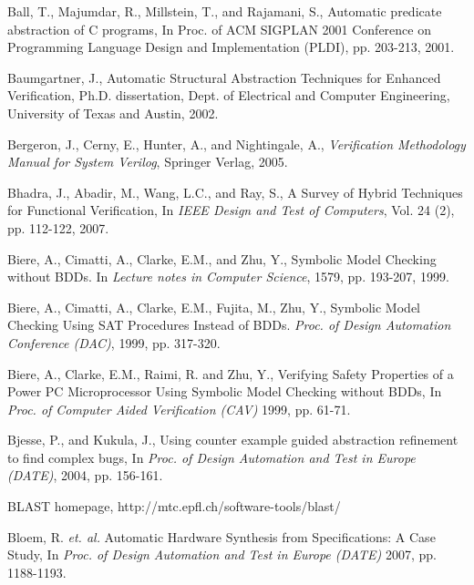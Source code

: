 {\begin{thebibliography}{99}
 Ball, T., Majumdar, R., Millstein, T., and 
	Rajamani, S., Automatic predicate abstraction of C programs, 
	In Proc. of ACM SIGPLAN 2001 Conference on Programming Language Design 
	and Implementation (PLDI), pp. 203-213, 2001. 


 Baumgartner, J., Automatic Structural Abstraction 
	Techniques for Enhanced Verification, Ph.D. dissertation, 
	Dept. of Electrical and Computer Engineering, University of 
	Texas and Austin, 2002. 

 Bergeron, J., Cerny, E., Hunter, A., and
	Nightingale, A., {\em Verification Methodology Manual for System
	Verilog}, Springer Verlag, 2005.

 Bhadra, J., Abadir, M., Wang, L.C., and Ray, S., 
	A Survey of Hybrid Techniques for Functional Verification, 
	In {\em IEEE Design and Test of Computers}, Vol. 24 (2), 
	pp. 112-122, 2007.

 Biere, A., Cimatti, A.,  Clarke, E.M., and Zhu, Y.,
	Symbolic Model Checking without BDDs. In {\em Lecture notes in
	Computer Science}, 1579, pp. 193-207, 1999.

 Biere, A., Cimatti, A., Clarke, E.M., Fujita, M., Zhu, Y.,
        Symbolic Model Checking Using SAT Procedures Instead of BDDs.
        {\em Proc. of Design Automation Conference (DAC)}, 1999, 
	pp. 317-320.

 Biere, A., Clarke, E.M., Raimi, R. and Zhu, Y., 
	Verifying Safety Properties of a Power PC Microprocessor Using 
	Symbolic Model Checking without BDDs, In 
	{\em Proc. of Computer Aided Verification
    (CAV)} 1999, pp. 61-71. 

 Bjesse, P., and Kukula, J.,
        Using counter example guided abstraction refinement to find
        complex bugs, In {\em Proc. of Design Automation and Test in 
	Europe (DATE)}, 2004, pp. 156-161.

 BLAST homepage, http://mtc.epfl.ch/software-tools/blast/ 

 Bloem, R. {\em et. al.} Automatic Hardware Synthesis
        from Specifications: A Case Study, 
	In {\em Proc. of Design Automation and Test in 
	Europe (DATE)} 2007, pp. 1188-1193.


\end{thebibliography}}
